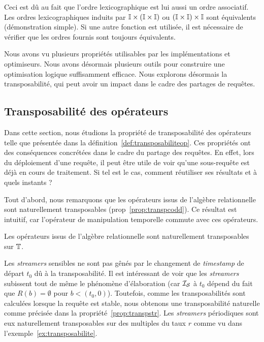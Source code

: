 Ceci est dû au fait que l'ordre lexicographique est lui aussi un ordre associatif. Les ordres lexicographiques induits par $\mathbb{I}\times(\mathbb{I}\times\mathbb{I})$ ou $(\mathbb{I}\times\mathbb{I})\times \mathbb{I}$ sont équivalents (démonstration simple). Si une autre fonction est utilisée, il est nécessaire de vérifier que les ordres fournis sont toujours équivalents.

Nous avons vu plusieurs propriétés utilisables par les implémentations et optimiseurs. Nous avons désormais plusieurs outils pour construire une optimisation logique suffisamment efficace. Nous explorons désormais la transposabilité, qui peut avoir un impact dans le cadre des partages de requêtes.

\subsection{Transposabilité des opérateurs}
Dans cette section, nous étudions la propriété de transposabilité des opérateurs telle que présentée dans la définition~\ref{def:transposabiliteop}. Ces propriétés ont des conséquences concrétées dans le cadre du partage des requêtes. En effet, lors du déploiement d'une requête, il peut être utile de voir qu'une sous-requête est déjà en cours de traitement. Si tel est le cas, comment réutiliser ses résultats et à quels instants ?

Tout d'abord, nous remarquons que les opérateurs issus de l'algèbre relationnelle sont naturellement transposables (prop~\ref{prop:transpcodd}). Ce résultat est intuitif, car l'opérateur de manipulation temporelle commute avec ces opérateurs.
\begin{prop}\label{prop:transpcodd}
    Les opérateurs issus de l'algèbre relationnelle sont naturellement transposables sur $\mathbb{T}$.
\end{prop}

Les \textit{streamers} sensibles ne sont pas gênés par le changement de \textit{timestamp} de départ $t_0$ dû à la transposabilité. Il est intéressant de voir que les \textit{streamers} subissent tout de même le phénomène d'élaboration (car $\mathcal{I_S}$ à $t_0$ dépend du fait que $R(b)=\emptyset$ pour $b<(t_0,0)$). Toutefois, comme les transposabilités sont calculées lorsque la requête est stable, nous obtenons une transposabilité naturelle comme précisée dans la propriété~\ref{prop:transpstr}. Les \textit{streamers} périodiques sont eux naturellement transposables sur des multiples du taux $r$ comme vu dans l'exemple~\ref{ex:transposabilite}.

